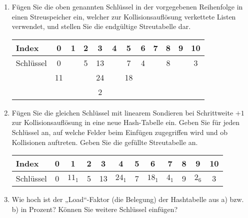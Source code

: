 \documentclass{lehramt-informatik-aufgabe}
\begin{document}
\begin{enumerate}


\item Fügen Sie die oben genannten Schlüssel in der vorgegebenen
Reihenfolge in einen Streuspeicher ein, welcher zur Kollisionsauflösung
verkettete Listen verwendet, und stellen Sie die endgültige
Streutabelle dar.

\begin{liAntwort}
\begin{center}
\begin{tabular}{l|ccccccccccc}
Index     & 0  & 1 & 2 & 3  & 4 & 5  & 6 & 7 & 8 & 9 & 10\\\hline
Schlüssel & 0  &   & 5 & 13 &   & 7  & 4 &   & 8 &   & 3 \\
          & 11 &   &   & 24 &   & 18 &   &   &   &   &  \\
          &    &   &   & 2  &   &    &   &   &   &   &  \\
\end{tabular}
\end{center}
\end{liAntwort}


\item Fügen Sie die gleichen Schlüssel mit linearem Sondieren bei
Schrittweite $+1$ zur Kollisionsauflösung in eine neue Hash-Tabelle ein.
Geben Sie für jeden Schlüssel an, auf welche Felder beim Einfügen
zugegriffen wird und ob Kollisionen auftreten. Geben Sie die gefüllte
Streutabelle an.

\begin{liAntwort}
\begin{center}
\begin{tabular}{l|ccccccccccc}
Index     & 0  & 1      & 2 & 3  & 4       & 5  & 6      & 7      & 8 & 9      & 10\\\hline
Schlüssel & 0  & $11_1$ & 5 & 13 & $24_1$  & 7  & $18_1$ & $4_1$  & 9 & $2_6$  & 3 \\
\end{tabular}
\end{center}
\end{liAntwort}


\item Wie hoch ist der „Load“-Faktor (die Belegung) der Hashtabelle aus
a) bzw. b) in Prozent? Können Sie weitere Schlüssel einfügen?

\begin{liAntwort}


\end{liAntwort}
\end{enumerate}
\end{document}
